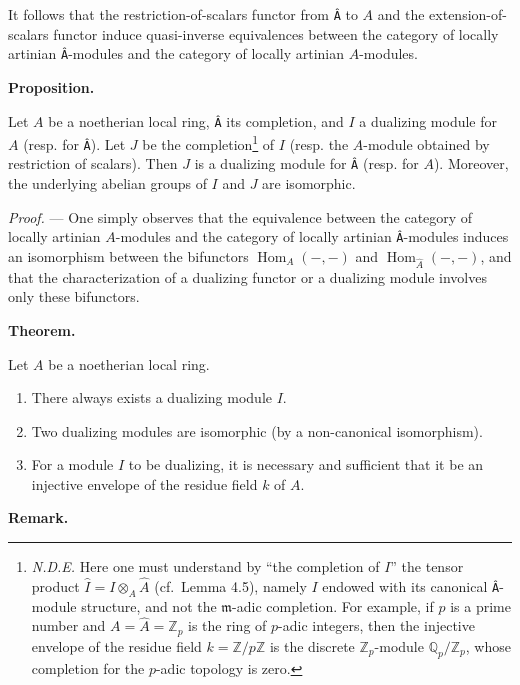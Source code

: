 \documentclass[
  11pt,
  a4paper,
]{book}
\begin{document}
It follows that the restriction-of-scalars functor from \texttt{Â} to
\(A\) and the extension-of-scalars functor induce quasi-inverse
equivalences between the category of locally artinian \texttt{Â}-modules
and the category of locally artinian \(A\)-modules.

\textbf{Proposition.}

Let \(A\) be a noetherian local ring, \texttt{Â} its completion, and
\(I\) a dualizing module for \(A\) (resp. for \texttt{Â}). Let \(J\) be
the completion\footnote{\emph{N.D.E.} Here one must understand by ``the
  completion of \(I\)'' the tensor product \(\hat{I} = I \otimes_{A}
  \hat{A}\) (cf.~Lemma 4.5), namely \(I\) endowed with its canonical
  \texttt{Â}-module structure, and not the \(\mathfrak{m}\)-adic
  completion. For example, if \(p\) is a prime number and
  \(A = \hat{A} = \mathbb{Z}_{p}\) is the ring of \(p\)-adic integers,
  then the injective envelope of the residue field
  \(k = \mathbb{Z}/p\mathbb{Z}\) is the discrete
  \(\mathbb{Z}_{p}\)-module \(\mathbb{Q}_{p}/\mathbb{Z}_{p}\), whose
  completion for the \(p\)-adic topology is zero.} of \(I\) (resp. the
\(A\)-module obtained by restriction of scalars). Then \(J\) is a
dualizing module for \texttt{Â} (resp. for \(A\)). Moreover, the
underlying abelian groups of \(I\) and \(J\) are isomorphic.

\emph{Proof.} --- One simply observes that the equivalence between the
category of locally artinian \(A\)-modules and the category of locally
artinian \texttt{Â}-modules induces an isomorphism between the
bifunctors \(\operatorname{Hom}_{A}(-, -)\) and
\(\operatorname{Hom}_{\hat{A}}(-, -)\), and that the characterization of
a dualizing functor or a dualizing module involves only these
bifunctors.

\textbf{Theorem.}

Let \(A\) be a noetherian local ring.

\begin{enumerate}
\def\labelenumi{\alph{enumi})}
\item
  There always exists a dualizing module \(I\).
\item
  Two dualizing modules are isomorphic (by a non-canonical isomorphism).
\item
  For a module \(I\) to be dualizing, it is necessary and sufficient
  that it be an injective envelope of the residue field \(k\) of \(A\).
\end{enumerate}

\textbf{Remark.}
\end{document}
